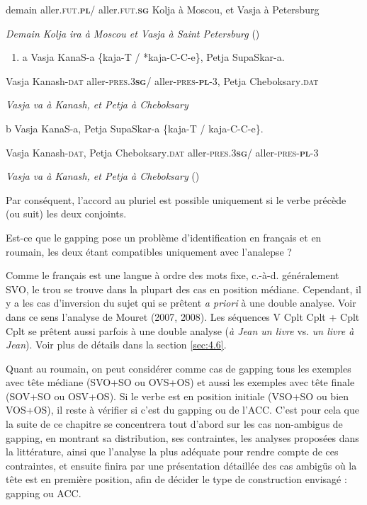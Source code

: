 demain aller.\textsc{fut.}\textbf{\textsc{pl}}\textsc{/} aller.\textsc{fut.}\textbf{\textsc{sg}} Kolja à Moscou, et Vasja à Petersburg

\textit{Demain Kolja ira à Moscou et Vasja à Saint Petersburg}      (\citet{Kazenin2001})


\begin{enumerate}
\item \label{bkm:Ref287483765}a  Vasja KanaS-a  \{kaja-T / *kaja-C-C-e\},     Petja SupaSkar-a.


\end{enumerate}
Vasja Kanash-\textsc{dat} aller-\textsc{pres.3}\textbf{\textsc{sg}}\textsc{/} aller-\textsc{pres-}\textbf{\textsc{pl}}\textsc{-3,} Petja Cheboksary\textsc{.dat}

{\itshape
Vasja va à Kanash, et Petja à Cheboksary}

 b  Vasja KanaS-a,   Petja SupaSkar-a   \{kaja-T / kaja-C-C-e\}.

Vasja Kanash-\textsc{dat,} Petja Cheboksary\textsc{.dat} aller-\textsc{pres.3}\textbf{\textsc{sg}}\textsc{/} aller-\textsc{pres-}\textbf{\textsc{pl}}\textsc{-3}

\textit{Vasja va à Kanash, et Petja à Cheboksary       }   (\citet{Kazenin2001})

Par conséquent, l'accord au pluriel est possible uniquement si le verbe précède (ou suit) les deux conjoints.

Est-ce que le gapping pose un problème d'identification en français et en roumain, les deux étant compatibles uniquement avec l'analepse ?

Comme le français est une langue à ordre des mots fixe, c.-à-d. généralement SVO, le trou se trouve dans la plupart des cas en position médiane. Cependant, il y a les cas d'inversion du sujet qui se prêtent \textit{a priori} à une double analyse. Voir dans ce sens l'analyse de Mouret (2007, 2008). Les séquences V Cplt Cplt + Cplt Cplt se prêtent aussi parfois à une double analyse (\textit{à Jean un livre} vs. \textit{un livre à Jean}). Voir plus de détails dans la section \ref{sec:4.6}.

Quant au roumain, on peut considérer comme cas de gapping tous les exemples avec tête médiane (SVO+SO ou OVS+OS) et aussi les exemples avec tête finale (SOV+SO ou OSV+OS). Si le verbe est en position initiale (VSO+SO ou bien VOS+OS), il reste à vérifier si c'est du gapping ou de l'ACC. C'est pour cela que la suite de ce chapitre se concentrera tout d'abord sur les cas non-ambigus de gapping, en montrant sa distribution, ses contraintes, les analyses proposées dans la littérature, ainsi que l'analyse la plus adéquate pour rendre compte de ces contraintes, et ensuite finira par une présentation détaillée des cas ambigüs où la tête est en première position, afin de décider le type de construction envisagé : gapping ou ACC. 

